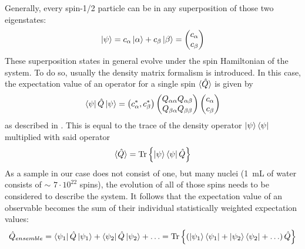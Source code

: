             Generally, every spin-1/2 particle can be in any superposition of those two eigenstates:
            \begin{equation}
                \ket\psi = c_\alpha \ket\alpha + c_\beta \ket \beta = \begin{pmatrix} c_\alpha \\
                c_\beta\end{pmatrix}
            \end{equation}
            These superposition states in general evolve under the spin Hamiltonian of the system.  To do so, usually the density matrix formalism is introduced.
             In this case, the
            expectation value of an operator for a single spin $\braket{\hat Q}$ is given by 
            \begin{equation}
            \bra\psi\hat Q\ket\psi = \left( c_\alpha^*, c_\beta^*\right)
            \begin{pmatrix}
                Q_{\alpha\alpha} Q_{\alpha\beta}\\
                Q_{\beta\alpha} Q_{\beta\beta}
            \end{pmatrix}
            \begin{pmatrix}
                c_\alpha\\
                c_\beta
            \end{pmatrix}
            \end{equation}
            as described in \cite{sakurai_modern_2017}. This is equal to the trace of the density operator
            $\ket\psi\bra\psi$ multiplied with said operator \cite{levitt_spin_nodate}
            \begin{equation}
                \braket{\hat Q} = \operatorname{Tr} \left\{\ket\psi\bra\psi\hat Q\right\}
            \end{equation}
            As a sample in our case does not consist of one, but many nuclei (\SI{1}{\milli\liter} of water consists of $\sim$ $7\cdot 10^{22}$ spins), the evolution of all of those spins needs to be considered to describe the system. 
            It follows that the expectation value of an observable becomes the sum of their individual statistically weighted expectation values:
            \begin{equation}
                \hat Q_{ensemble}= \bra{\psi_1}\hat Q\ket{\psi_1} + \bra{\psi_2}\hat Q\ket{\psi_2} + \hdots =
                \operatorname{Tr}{\left\{\left(\ket{\psi_1}\bra{\psi_1} + \ket{\psi_2}\bra{\psi_2}+ \hdots \right) \hat Q\right\}}
            \end{equation}
